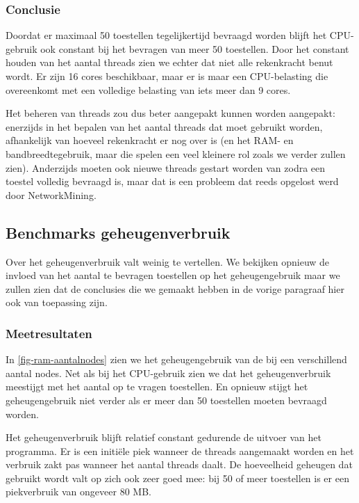 \subsubsection{Conclusie}

Doordat er maximaal 50 toestellen tegelijkertijd bevraagd worden blijft het CPU-gebruik ook constant bij het bevragen van meer 50 toestellen.
Door het constant houden van het aantal threads zien we echter dat niet alle rekenkracht benut wordt.
Er zijn 16 cores beschikbaar, maar er is maar een CPU-belasting die overeenkomt met een volledige belasting van iets meer dan 9 cores.

Het beheren van threads zou dus beter aangepakt kunnen worden aangepakt:
enerzijds in het bepalen van het aantal threads dat moet gebruikt worden, afhankelijk van hoeveel rekenkracht er nog over is
(en het RAM- en bandbreedtegebruik, maar die spelen een veel kleinere rol zoals we verder zullen zien).
Anderzijds moeten ook nieuwe threads gestart worden van zodra een toestel volledig bevraagd is,
maar dat is een probleem dat reeds opgelost werd door NetworkMining.

\subsection{Benchmarks geheugenverbruik}
\label{benchmarks-geheugengebruik}

Over het geheugenverbruik valt weinig te vertellen.
We bekijken opnieuw de invloed van het aantal te bevragen toestellen op het geheugengebruik maar
we zullen zien dat de conclusies die we gemaakt hebben in de vorige paragraaf hier ook van toepassing zijn.

\subsubsection{Meetresultaten}

In \cref{fig-ram-aantalnodes} zien we het geheugengebruik van de \nwmretriever{} bij een verschillend aantal nodes.
Net als bij het CPU-gebruik zien we dat het geheugenverbruik meestijgt met het aantal op te vragen toestellen.
En opnieuw stijgt het geheugengebruik niet verder als er meer dan 50 toestellen moeten bevraagd worden.

Het geheugenverbruik blijft relatief constant gedurende de uitvoer van het programma.
Er is een initiële piek wanneer de threads aangemaakt worden en het verbruik zakt pas wanneer het aantal threads daalt.
De hoeveelheid geheugen dat gebruikt wordt valt op zich ook zeer goed mee: bij 50 of meer toestellen is er een piekverbruik van ongeveer 80 MB.

